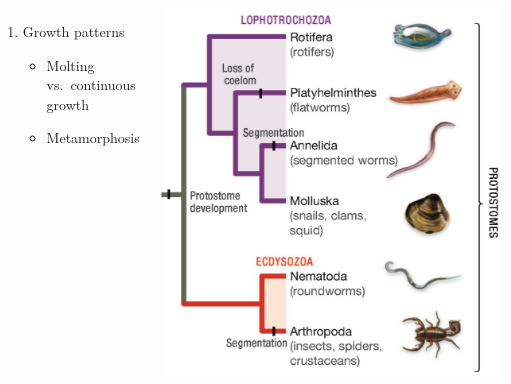 \begin{frame}[t]
    \begin{adjustwidth}{-2em}{-1.5em}

        \vspace{-4mm}
        \begin{columns}[t]


        \begin{enumerate}
            \addtocounter{enumi}{5}

            \item Growth patterns

                \begin{itemize}
                    \item Molting vs.\ continuous growth

                        \vspace{5mm}
                    \item Metamorphosis

                \end{itemize}

        \end{enumerate}


        \includegraphics[width=\columnwidth]{animal-phylogeny-zoom.png}

        \end{columns}
    \end{adjustwidth}
\end{frame}

